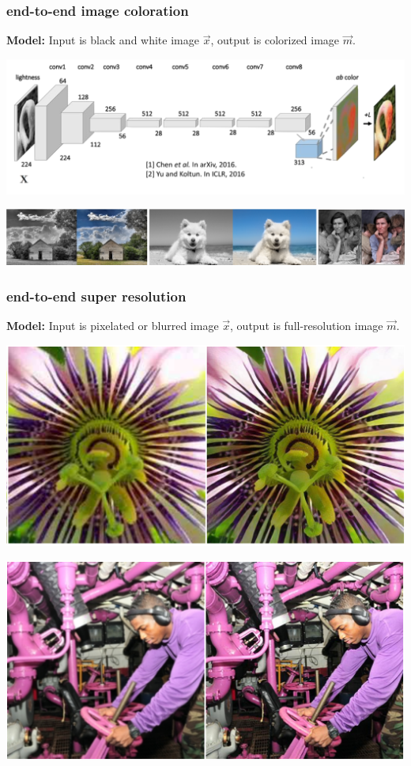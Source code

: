 \documentclass[handout,compress]{beamer}
\begin{document}
\begin{frame}
	\frametitle{end-to-end image coloration}
	\textbf{Model:} Input is black and white image $\vec{x}$, output is colorized image $\vec{m}$. 
	\begin{center}
		\includegraphics[width=.8\textwidth]{colorizer.png}
		
		\includegraphics[width=\textwidth]{colorized_results.png}
	\end{center}
\end{frame}

\begin{frame}
	\frametitle{end-to-end super resolution}
	\textbf{Model:} Input is pixelated or blurred image $\vec{x}$, output is full-resolution image $\vec{m}$. 
	\begin{center}
		\includegraphics[width=.6\textwidth]{superresolution.png}
		
		 \includegraphics[width=.6\textwidth]{superresolution2.png}
	\end{center}
\end{frame}
\end{document}
